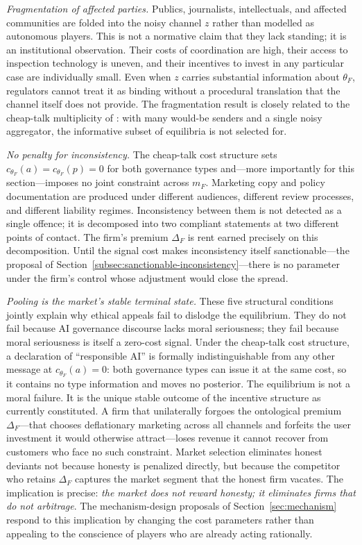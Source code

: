 \emph{Fragmentation of affected parties.} Publics, journalists, intellectuals, and affected communities are folded into the noisy channel $z$ rather than modelled as autonomous players. This is not a normative claim that they lack standing; it is an institutional observation. Their costs of coordination are high, their access to inspection technology is uneven, and their incentives to invest in any particular case are individually small. Even when $z$ carries substantial information about $\theta_F$, regulators cannot treat it as binding without a procedural translation that the channel itself does not provide. The fragmentation result is closely related to the cheap-talk multiplicity of \citet{crawford_sobel1982}: with many would-be senders and a single noisy aggregator, the informative subset of equilibria is not selected for.

\emph{No penalty for inconsistency.} The cheap-talk cost structure sets $c_{\theta_F}(a)=c_{\theta_F}(p)=0$ for both governance types and---more importantly for this section---imposes no joint constraint across $m_F$. Marketing copy and policy documentation are produced under different audiences, different review processes, and different liability regimes. Inconsistency between them is not detected as a single offence; it is decomposed into two compliant statements at two different points of contact. The firm's premium $\Delta_F$ is rent earned precisely on this decomposition. Until the signal cost makes inconsistency itself sanctionable---the proposal of Section~\ref{subsec:sanctionable-inconsistency}---there is no parameter under the firm's control whose adjustment would close the spread.

\emph{Pooling is the market's stable terminal state.} These five structural conditions jointly explain why ethical appeals fail to dislodge the equilibrium. They do not fail because AI governance discourse lacks moral seriousness; they fail because moral seriousness is itself a zero-cost signal. Under the cheap-talk cost structure, a declaration of ``responsible AI'' is formally indistinguishable from any other message at $c_{\theta_F}(a)=0$: both governance types can issue it at the same cost, so it contains no type information and moves no posterior. The equilibrium is not a moral failure. It is the unique stable outcome of the incentive structure as currently constituted. A firm that unilaterally forgoes the ontological premium $\Delta_F$---that chooses deflationary marketing across all channels and forfeits the user investment it would otherwise attract---loses revenue it cannot recover from customers who face no such constraint. Market selection eliminates honest deviants not because honesty is penalized directly, but because the competitor who retains $\Delta_F$ captures the market segment that the honest firm vacates. The implication is precise: \emph{the market does not reward honesty; it eliminates firms that do not arbitrage}. The mechanism-design proposals of Section~\ref{sec:mechanism} respond to this implication by changing the cost parameters rather than appealing to the conscience of players who are already acting rationally.

